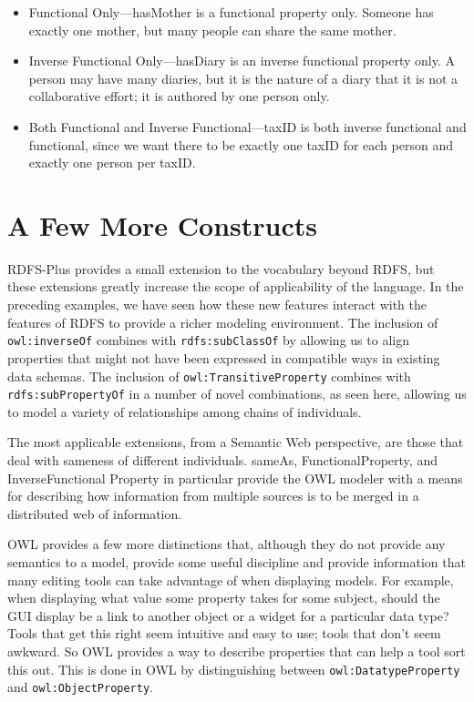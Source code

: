 \begin{itemize}
\item Functional Only---hasMother is a functional property only. Someone has
exactly one mother, but many people can share the same mother.

\item Inverse Functional Only---hasDiary is an inverse functional property
only. A person may have many diaries, but it is the nature of a diary
that it is not a collaborative effort; it is authored by one person
only.

\item Both Functional and Inverse Functional---taxID is both inverse
functional and functional, since we want there to be exactly one taxID
for each person and exactly one person per taxID.
\end{itemize}





\section{A Few More Constructs}

RDFS-Plus provides a small extension to the vocabulary beyond RDFS, but
these extensions greatly increase the scope of applicability of the
language. In the preceding examples, we have seen how these new features
interact with the features of RDFS to provide a richer modeling
environment. The inclusion of \texttt{owl:inverseOf} combines with
\texttt{rdfs:subClassOf} by allowing us to align
properties that might not have been expressed in compatible ways in
existing data schemas. The inclusion of \texttt{owl:TransitiveProperty} combines
with \texttt{rdfs:subPropertyOf} in a number of novel combinations, as seen here,
allowing us to model a variety of relationships among chains of
individuals.

The most applicable extensions, from a Semantic Web perspective, are
those that deal with sameness of different individuals. sameAs,
FunctionalProperty, and InverseFunctional Property in particular provide
the OWL modeler with a means for describing how information from
multiple sources is to be merged in a distributed web of information.

OWL provides a few more distinctions that, although they do not provide
any semantics to a model, provide some useful discipline and provide
information that many editing tools can take advantage of when
displaying models. For example, when displaying what value some property
takes for some subject, should the GUI display be a link to another
object or a widget for a particular data type? Tools that get this right
seem intuitive and easy to use; tools that don't seem awkward. So OWL
provides a way to describe properties that can help a tool sort this
out. This is done in OWL by distinguishing between \texttt{owl:DatatypeProperty}
and \texttt{owl:ObjectProperty}.

